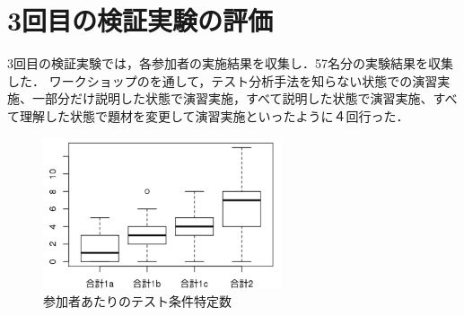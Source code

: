 \documentclass[a4paper,12pt]{jreport}
\begin{document}
\section{3回目の検証実験の評価}
3回目の検証実験では，各参加者の実施結果を収集し．57名分の実験結果を収集した．
ワークショップのを通して，テスト分析手法を知らない状態での演習実施、一部分だけ説明した状態で演習実施，すべて説明した状態で演習実施、すべて理解した状態で題材を変更して演習実施といったように４回行った．
\begin{figure}[h]
  \begin{center}
  \includegraphics[width=7cm]{./image/D-3-Fig10.png}
  \caption{参加者あたりのテスト条件特定数}
  \label{fig:D-3-Fig10}
  \end{center}
   \end{figure}
\end{document}
